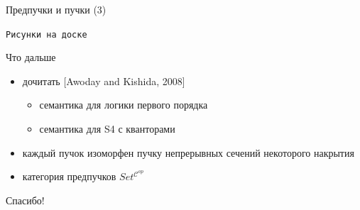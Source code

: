 \documentclass{beamer}
\begin{document}
\begin{frame}{Предпучки и пучки (3)}
\begin{center}
	\texttt{Рисунки на доске}
\end{center}
\end{frame}


\begin{frame}{Что дальше}
\begin{itemize}
	\item дочитать [Awoday and Kishida, 2008]
		\begin{itemize}
			\item семантика для логики первого порядка
			\item семантика для S4 с кванторами
		\end{itemize}
	\item каждый пучок изоморфен пучку непрерывных сечений некоторого накрытия
	\item категория предпучков $Set^{\mathcal{C}^{op}}$
\end{itemize}
\end{frame}




\begin{frame}{}
    \thispagestyle{empty}
    \begin{center}
        {\large Спасибо!}
    \end{center}
\end{frame}


\end{document}
